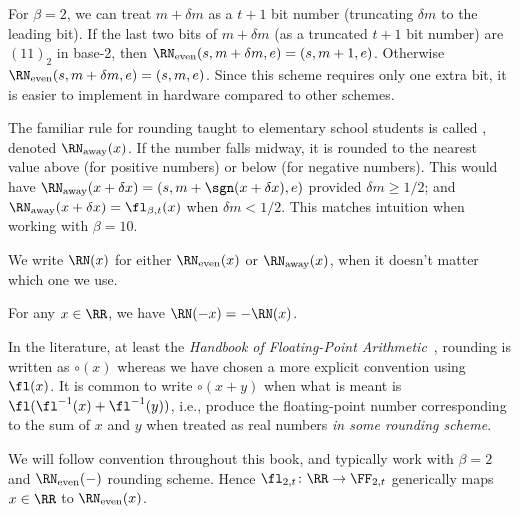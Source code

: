 \begin{rmk}
  For $\beta=2$, we can treat $m+\delta m$ as a $t+1$ bit number
  (truncating $\delta m$ to the leading bit). If the last two bits of
  $m+\delta m$ (as a truncated $t+1$ bit number) are
  $(11)_{2}$ in base-2, then $\RN_{\text{even}}(s,m+\delta m,e)=(s,m+1,e)$.
  Otherwise $\RN_{\text{even}}(s,m+\delta m,e)=(s,m,e)$. Since this
  scheme requires only one extra bit, it is easier to implement in
  hardware compared to other schemes.
\end{rmk}
\begin{defn}
  The familiar rule for rounding taught to elementary school students is
  called , denoted $\RN_{\text{away}}(x)$. If the number falls
  midway, it is rounded to the nearest value above (for positive
  numbers) or below (for negative numbers). This would have
  $\RN_{\text{away}}(x+\delta x)=(s,m+\sgn(x+\delta x), e)$ provided $\delta m\geq1/2$;
  and $\RN_{\text{away}}(x+\delta x)=\fl_{\beta,t}(x)$ when $\delta m<1/2$.
  This matches intuition when working with $\beta=10$.
\end{defn}

\begin{notation}
  We write $\RN(x)$ for either $\RN_{\text{even}}(x)$ or $\RN_{\text{away}}(x)$,
  when it doesn't matter which one we use.
\end{notation}

\begin{thm}
  For any $x\in\RR$, we have $\RN(-x)=-\RN(x)$.
\end{thm}

\begin{notation}
In the literature, at least the \emph{Handbook of Floating-Point Arithmetic}~\cite{10.5555/3235984},
rounding is written as $\circ(x)$ whereas we have chosen a more explicit
convention using $\fl(x)$. It is common to write $\circ(x+y)$ when what
is meant is $\fl(\fl^{-1}(x)+\fl^{-1}(y))$, i.e., produce the
floating-point number corresponding to the sum of $x$ and $y$ when
treated as real numbers \emph{in some rounding scheme}.
\end{notation}

\begin{convention}
  We will follow  convention throughout this book, and
  typically work with $\beta=2$ and $\RN_{\text{even}}(-)$ rounding scheme.
  Hence $\fl_{2,t}\colon\RR\to\FF_{2,t}$ generically maps $x\in\RR$ to
  $\RN_{\text{even}}(x)$.
\end{convention}

